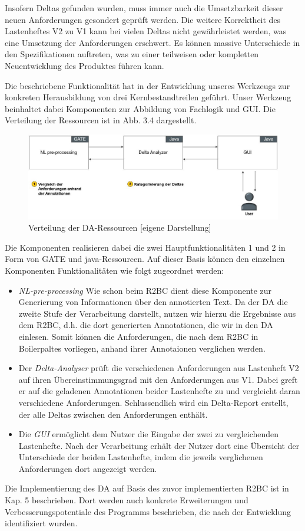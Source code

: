 \documentclass[12pt]{report}
\begin{document}
Insofern Deltas gefunden wurden, muss immer auch die Umsetzbarkeit dieser neuen Anforderungen gesondert geprüft werden. Die weitere Korrektheit des Lastenheftes V2 zu V1 kann bei vielen Deltas nicht gewährleistet werden, was eine Umsetzung der Anforderungen erschwert. Es können massive Unterschiede in den Spezifikationen auftreten, was zu einer teilweisen oder kompletten Neuentwicklung des Produktes führen kann.

Die beschriebene Funktionalität hat in der Entwicklung unseres Werkzeugs zur konkreten Herausbildung von drei Kernbestandtreilen geführt. Unser Werkzeug beinhaltet dabei Komponenten zur Abbildung von Fachlogik und GUI. Die Verteilung der Ressourcen ist in Abb. 3.4 dargestellt. 
\begin{figure}[h!]
\begin{center}
\includegraphics[scale=0.6]{Bilder/Verteilung-DA.jpg}
\caption{Verteilung der DA-Ressourcen [eigene Darstellung]}
\end{center}
\end{figure}
Die Komponenten realisieren dabei die zwei Hauptfunktionalitäten 1 und 2 in Form von GATE und java-Ressourcen. Auf dieser Basis können den einzelnen Komponenten Funktionalitäten wie folgt zugeordnet werden:
\begin{itemize}
\item \textit{NL-pre-processing} Wie schon beim R2BC dient diese Komponente zur Generierung von Informationen über den annotierten Text. Da der DA die zweite Stufe der Verarbeitung darstellt, nutzen wir hierzu die Ergebnisse aus dem R2BC, d.h. die dort generierten Annotationen, die wir in den DA einlesen. Somit können die Anforderungen, die nach dem R2BC in Boilerpaltes vorliegen, anhand ihrer Annotaionen verglichen werden.
\item Der \textit{Delta-Analyser} prüft die verschiedenen Anforderungen aus Lastenheft V2 auf ihren Übereinstimmungsgrad mit den Anforderungen aus V1. Dabei greft er auf die geladenen Annotationen beider Lastenhefte zu und vergleicht daran verschiedene Anforderungen. Schlussendlich wird ein Delta-Report erstellt, der alle Deltas zwischen den Anforderungen enthält.
\item Die \textit{GUI} ermöglicht dem Nutzer die Eingabe der zwei zu vergleichenden Lastenhefte. Nach der Verarbeitung erhält der Nutzer dort eine Übersicht der Unterschiede der beiden Lastenhefte, indem die jeweils verglichenen Anforderungen dort angezeigt werden.
\end{itemize}
Die Implementierung des DA auf Basis des zuvor implementierten R2BC ist in Kap. 5 beschrieben. Dort werden auch konkrete Erweiterungen und Verbesserungspotentiale des Programms beschrieben, die nach der Entwicklung identifiziert wurden.
\end{document}
